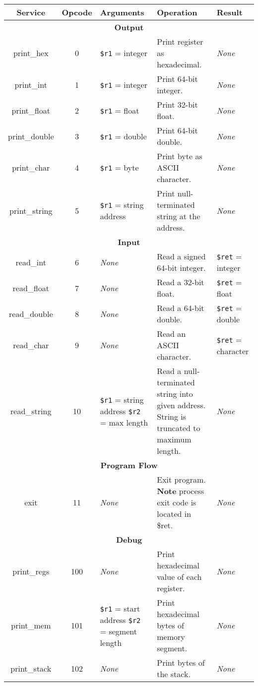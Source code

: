\documentclass[10pt]{article}
\begin{document}
\bigskip
\begin{longtable}{|c|c|l|l|l|}
    \hline
    \textbf{Service} & \textbf{Opcode} & \textbf{Arguments} & \textbf{Operation} & \textbf{Result} \\
    \hline
    \multicolumn{5}{|c|}{\textbf{Output}} \\
    \hline
    print\_hex & 0 & \texttt{\$r1} = integer & Print register as hexadecimal. & \textit{None} \\
    \hline
    print\_int & 1 & \texttt{\$r1} = integer & Print 64-bit integer. & \textit{None} \\
    \hline
    print\_float & 2 & \texttt{\$r1} = float & Print 32-bit float. & \textit{None} \\
    \hline
    print\_double & 3 & \texttt{\$r1} = double & Print 64-bit double. & \textit{None} \\
    \hline
    print\_char & 4 & \texttt{\$r1} = byte & Print byte as ASCII character. & \textit{None} \\
    \hline
    print\_string & 5 & \texttt{\$r1} = string address & Print null-terminated string at the address. & \textit{None} \\
    \hline \hline
    \multicolumn{5}{|c|}{\textbf{Input}} \\
    \hline
    read\_int & 6 & \textit{None} & Read a signed 64-bit integer. & \texttt{\$ret} = integer \\
    \hline
    read\_float & 7 & \textit{None} & Read a 32-bit float. & \texttt{\$ret} = float \\
    \hline
    read\_double & 8 & \textit{None} & Read a 64-bit double. & \texttt{\$ret} = double \\
    \hline
    read\_char & 9 & \textit{None} & Read an ASCII character. & \texttt{\$ret} = character \\
    \hline
    read\_string & 10 & \makecell[l]{\texttt{\$r1} = string address\\%
    \texttt{\$r2} = max length} & \makecell[l]{Read a null-terminated string into given address.\\%
    String is truncated to maximum length.} & \textit{None} \\
    \hline \hline
    \multicolumn{5}{|c|}{\textbf{Program Flow}} \\
    \hline
    exit & 11 & \textit{None} & \makecell[l]{Exit program.\\%
    \textbf{Note} process exit code is located in \$ret.} & \textit{None} \\
    \hline \hline
    \multicolumn{5}{|c|}{\textbf{Debug}} \\
    \hline
    print\_regs & 100 & \textit{None} & Print hexadecimal value of each register. & \textit{None} \\
    \hline
    print\_mem & 101 & \makecell[l]{\texttt{\$r1} = start address\\%
    \texttt{\$r2} = segment length} & Print hexadecimal bytes of memory segment. & \textit{None} \\
    \hline
    print\_stack & 102 & \textit{None} & Print bytes of the stack. & \textit{None} \\
    \hline
\end{longtable}
\end{document}
